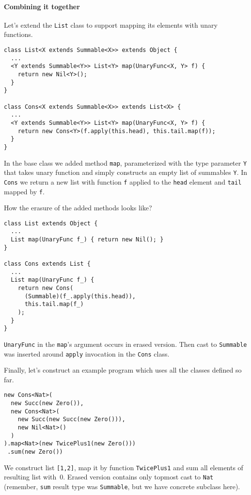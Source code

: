 \documentclass{article}[12pt]
\begin{document}
\paragraph{Combining it together}
Let's extend the \texttt{List} class to support mapping its
elements with unary functions.

\begin{verbatim}
class List<X extends Summable<X>> extends Object {
  ...
  <Y extends Summable<Y>> List<Y> map(UnaryFunc<X, Y> f) {
    return new Nil<Y>();
  }
}

class Cons<X extends Summable<X>> extends List<X> {
  ...
  <Y extends Summable<Y>> List<Y> map(UnaryFunc<X, Y> f) {
    return new Cons<Y>(f.apply(this.head), this.tail.map(f));
  }
}
\end{verbatim}
In the base class we added method \texttt{map}, parameterized with
the type parameter \texttt{Y} that takes unary function and simply
constructs an empty list of summables \texttt{Y}. In \texttt{Cons}
we return a new list with function \texttt{f} applied to the
\texttt{head} element and \texttt{tail} mapped by \texttt{f}.

How the erasure of the added methods looks like?

\begin{verbatim}
class List extends Object {
  ...
  List map(UnaryFunc f_) { return new Nil(); }
}

class Cons extends List {
  ...
  List map(UnaryFunc f_) {
    return new Cons(
      (Summable)(f_.apply(this.head)),
      this.tail.map(f_)
    );     
  }
}
\end{verbatim}
\texttt{UnaryFunc} in the \texttt{map}'s argument occurs in erased
version. Then cast to \texttt{Summable} was inserted around
\texttt{apply} invocation in the \texttt{Cons} class.

Finally, let's construct an example program which uses all the classes
defined so far.

\begin{verbatim}
new Cons<Nat>(
  new Succ(new Zero()),
  new Cons<Nat>(
    new Succ(new Succ(new Zero())),
    new Nil<Nat>()
  )
).map<Nat>(new TwicePlus1(new Zero()))
 .sum(new Zero())
\end{verbatim}
We construct list \texttt{[1,2]}, map it by function
\texttt{TwicePlus1} and sum all elements of resulting list
with~0. Erased version contains only topmost cast to \texttt{Nat}
(remember, \texttt{sum} result type was \texttt{Summable},
but we have concrete subclass here).
\end{document}
